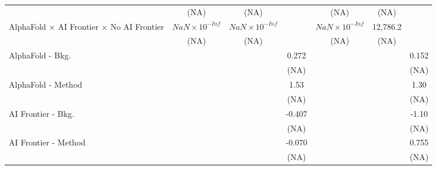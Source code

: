 \begin{tabular}{lcccccc}
                                                                              & (NA)                   & (NA)                   &                        & (NA)                   & (NA)     &   \\   
   AlphaFold $\times$ AI Frontier $\times$ No AI Frontier                     & $NaN\times 10^{-Inf}$  & $NaN\times 10^{-Inf}$  &                        & $NaN\times 10^{-Inf}$  & 12,786.2 &   \\   
                                                                              & (NA)                   & (NA)                   &                        & (NA)                   & (NA)     &   \\   
   AlphaFold - Bkg.                                                           &                        &                        & 0.272                  &                        &          & 0.152\\   
                                                                              &                        &                        & (NA)                   &                        &          & (NA)\\   
   AlphaFold - Method                                                         &                        &                        & 1.53                   &                        &          & 1.30\\   
                                                                              &                        &                        & (NA)                   &                        &          & (NA)\\   
   AI Frontier - Bkg.                                                         &                        &                        & -0.407                 &                        &          & -1.10\\   
                                                                              &                        &                        & (NA)                   &                        &          & (NA)\\   
   AI Frontier - Method                                                       &                        &                        & -0.070                 &                        &          & 0.755\\   
                                                                              &                        &                        & (NA)                   &                        &          & (NA)\\   

\end{tabular}
